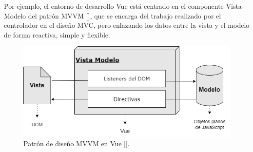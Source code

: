 Por ejemplo, el entorno de desarrollo Vue está centrado en el componente Vista-Modelo del patrón MVVM [\cite{49,47}], que se encarga del trabajo realizado por el controlador en el diseño MVC, pero enlazando los datos entre la vista y el modelo de forma reactiva, simple y flexible.

\begin{figure}[htbp]
\centering
\includegraphics[width=\textwidth]{Graphics/mvvm}
\caption{Patrón de diseño MVVM en Vue [\cite{47}].}
\label{fig:vmmv}
\end{figure}


